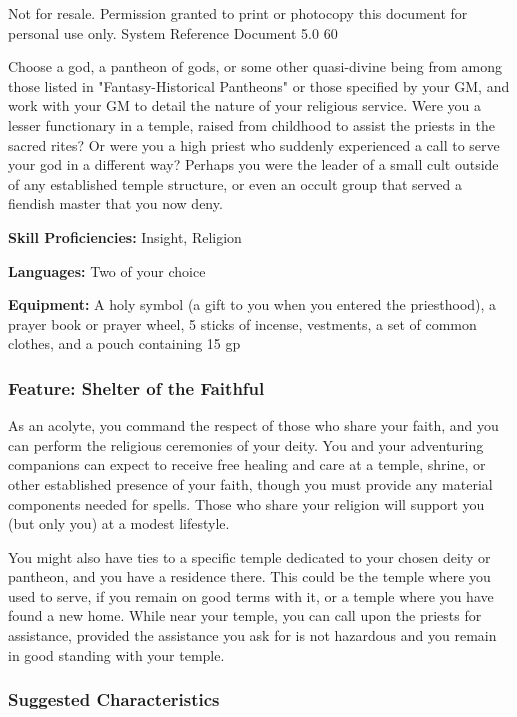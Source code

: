 \documentclass[
]{article}
\begin{document}
Not for resale. Permission granted to print or photocopy this document
for personal use only. System Reference Document 5.0 60

Choose a god, a pantheon of gods, or some other quasi-divine being from
among those listed in "Fantasy-Historical Pantheons" or those specified
by your GM, and work with your GM to detail the nature of your religious
service. Were you a lesser functionary in a temple, raised from
childhood to assist the priests in the sacred rites? Or were you a high
priest who suddenly experienced a call to serve your god in a different
way? Perhaps you were the leader of a small cult outside of any
established temple structure, or even an occult group that served a
fiendish master that you now deny.

\textbf{Skill Proficiencies:} Insight, Religion

\textbf{Languages:} Two of your choice

\textbf{Equipment:} A holy symbol (a gift to you when you entered the
priesthood), a prayer book or prayer wheel, 5 sticks of incense,
vestments, a set of common clothes, and a pouch containing 15 gp

\hypertarget{feature-shelter-of-the-faithful}{%
\subsubsection{Feature: Shelter of the
Faithful}\label{feature-shelter-of-the-faithful}}

As an acolyte, you command the respect of those who share your faith,
and you can perform the religious ceremonies of your deity. You and your
adventuring companions can expect to receive free healing and care at a
temple, shrine, or other established presence of your faith, though you
must provide any material components needed for spells. Those who share
your religion will support you (but only you) at a modest lifestyle.

You might also have ties to a specific temple dedicated to your chosen
deity or pantheon, and you have a residence there. This could be the
temple where you used to serve, if you remain on good terms with it, or
a temple where you have found a new home. While near your temple, you
can call upon the priests for assistance, provided the assistance you
ask for is not hazardous and you remain in good standing with your
temple.

\hypertarget{suggested-characteristics-1}{%
\subsubsection{Suggested
Characteristics}\label{suggested-characteristics-1}}
\end{document}
